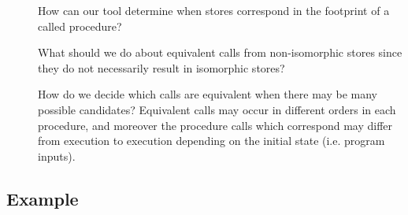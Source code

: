 \documentclass[runningheads,a4paper]{llncs}
\makeatletter
\newcommand*{\ie}{i.e.\@\xspace}
\makeatother
\begin{document}
\begin{description}
\item[\Ctwo{}]How can our tool determine when stores correspond in the footprint of a called procedure?

\item[\Cthree{}]What should we do about equivalent calls from non-isomorphic stores since they do not necessarily result in isomorphic stores?

\item[\Cfour{}]How do we decide which calls are equivalent when there may be many possible candidates? Equivalent calls may occur in different orders in each procedure, and moreover the procedure calls which correspond may differ from execution to execution depending on the initial state (\ie program inputs).
\end{description}
%
%
%
%
%

\subsection{Example}\label{sec:example}
\newcommand*{\copylr}{\texttt{lcopy}}
\newcommand*{\copyrl}{\texttt{rcopy}}
\newcommand*{\lang}{\ensuremath{\mathcal{L}}}
\end{document}
